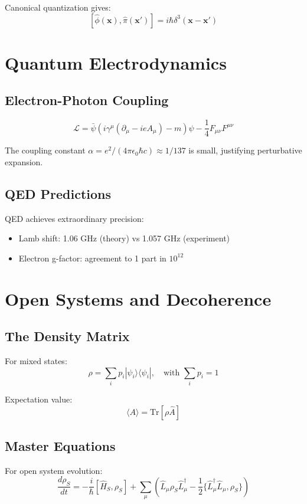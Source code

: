 \documentclass[12pt,oneside]{book}
\begin{document}
Canonical quantization gives:
$$[\hat{\phi}(\mathbf{x}), \hat{\pi}(\mathbf{x}')] = i\hbar\delta^3(\mathbf{x} - \mathbf{x}')$$

\chapter{Quantum Electrodynamics}

\section{Electron-Photon Coupling}

$$\mathcal{L} = \bar{\psi}(i\gamma^\mu(\partial_\mu - ieA_\mu) - m)\psi - \frac{1}{4}F_{\mu\nu}F^{\mu\nu}$$

The coupling constant $\alpha = e^2/(4\pi\epsilon_0\hbar c) \approx 1/137$ is small, justifying perturbative expansion.

\section{QED Predictions}

QED achieves extraordinary precision:
\begin{itemize}
  \item Lamb shift: 1.06 GHz (theory) vs 1.057 GHz (experiment)
  \item Electron g-factor: agreement to 1 part in $10^{12}$
\end{itemize}

\chapter{Open Systems and Decoherence}

\section{The Density Matrix}

For mixed states:
$$\rho = \sum_i p_i |\psi_i\rangle\langle\psi_i|, \quad \text{with } \sum_i p_i = 1$$

Expectation value:
$$\langle A \rangle = \text{Tr}[\rho\hat{A}]$$

\section{Master Equations}

For open system evolution:
$$\frac{d\rho_S}{dt} = -\frac{i}{\hbar}[\hat{H}_S, \rho_S] + \sum_\mu \left(\hat{L}_\mu\rho_S\hat{L}_\mu^\dagger - \frac{1}{2}\{\hat{L}_\mu^\dagger\hat{L}_\mu, \rho_S\}\right)$$
\end{document}
